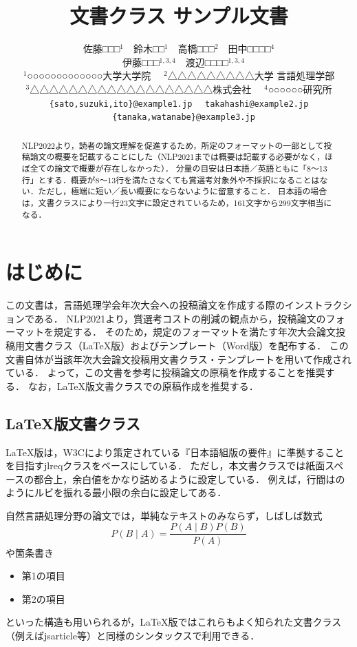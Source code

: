 \documentclass[
  platex, dvipdfmx,  %
]{nlp2024}
\title{\pkg{NLP2024}文書クラス サンプル文書}
\author{%
  佐藤□□□${}^{1}$　鈴木□□${}^{1}$　高橋□□□${}^{2}$　田中□□□□${}^{4}$\\
　伊藤□□□${}^{1,3,4}$　渡辺□□□□${}^{1,3,4}$\\
${}^{1}$○○○○○○○○○○○○○大学大学院
　${}^{2}$△△△△△△△△△大学 言語処理学部\\
${}^{3}$△△△△△△△△△△△△△△△△△△△株式会社 　${}^{4}$○○○○○○研究所\\ \texttt{\{sato,suzuki,ito\}@example1.jp}
　\texttt{takahashi@example2.jp}\\
　\texttt{\{tanaka,watanabe\}@example3.jp}}
\newcommand{\pkg}[1]{\textsf{#1}}
\begin{document}
\maketitle
\begin{abstract}
NLP2022より，読者の論文理解を促進するため，所定のフォーマットの一部として投稿論文の概要を記載することにした（NLP2021までは概要は記載する必要がなく，ほぼ全ての論文で概要が存在しなかった）．
分量の目安は日本語／英語ともに「8〜13行」とする．概要が8〜13行を満たさなくても賞選考対象外や不採択になることはない．ただし，極端に短い／長い概要にならないように留意すること．
日本語の場合は，文書クラスにより一行23文字に設定されているため，161文字から299文字相当になる．
\end{abstract}

\section{はじめに}
この文書は，言語処理学会年次大会への投稿論文を作成する際のインストラクションである．
NLP2021より，賞選考コストの削減の観点から，投稿論文のフォーマットを規定する．
そのため，規定のフォーマットを満たす年次大会論文投稿用文書クラス（LaTeX版）およびテンプレート（Word版）を配布する．
この文書自体が当該年次大会論文投稿用文書クラス・テンプレートを用いて作成されている．
よって，この文書を参考に投稿論文の原稿を作成することを推奨する．
なお，LaTeX版文書クラスでの原稿作成を推奨する．

\subsection{LaTeX版文書クラス}
LaTeX版は，W3Cにより策定されている『日本語組版の要件』\cite{JLREQ}に準拠することを目指す\pkg{jlreq}クラスをベースにしている．
ただし，本文書クラスでは紙面スペースの都合上，余白値をかなり詰めるように設定している．
例えば，行間はのようにルビを振れる最小限の余白に設定してある．

自然言語処理分野の論文では，単純なテキストのみならず，しばしば数式
%
\begin{equation}
P(B\mid A) = \frac{P(A\mid B)P(B)}{P(A)}
\end{equation}
%
や箇条書き
%
\begin{itemize}
\item 第1の項目
\item 第2の項目
\end{itemize}
%
といった構造も用いられるが，LaTeX版ではこれらもよく知られた文書クラス（例えば\pkg{jsarticle}等）と同様のシンタックスで利用できる．
\end{document}
